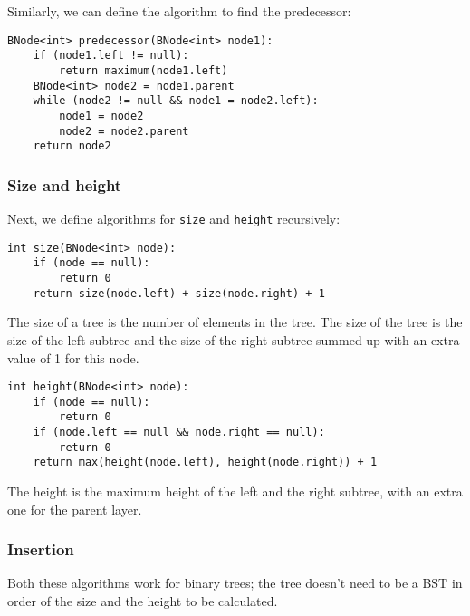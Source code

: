 \documentclass[a4paper, openany]{memoir}
\begin{document}
\noindent Similarly, we can define the algorithm to find the predecessor:
\begin{lstlisting}[language=pseudocode]
BNode<int> predecessor(BNode<int> node1):
    if (node1.left != null):
        return maximum(node1.left)
    BNode<int> node2 = node1.parent
    while (node2 != null && node1 = node2.left):
        node1 = node2
        node2 = node2.parent
    return node2
\end{lstlisting}

\subsubsection{Size and height}
Next, we define algorithms for \texttt{size} and \texttt{height} recursively:
\begin{lstlisting}[language=pseudocode]
int size(BNode<int> node):
    if (node == null):
        return 0
    return size(node.left) + size(node.right) + 1
\end{lstlisting}
The size of a tree is the number of elements in the tree. The size of the tree is the size of the left subtree and the size of the right subtree summed up with an extra value of 1 for this node.
\begin{lstlisting}[language=pseudocode]
int height(BNode<int> node):
    if (node == null):
        return 0
    if (node.left == null && node.right == null):
        return 0
    return max(height(node.left), height(node.right)) + 1
\end{lstlisting}
The height is the maximum height of the left and the right subtree, with an extra one for the parent layer.

\subsubsection{Insertion}
Both these algorithms work for binary trees; the tree doesn't need to be a BST in order of the size and the height to be calculated.
\end{document}
